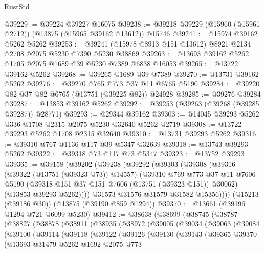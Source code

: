 \begin{lexlean}{RustStd}
\begin{coremodule}
@39229 := @39224 @39227 @16075
@39238 := @39218 @39229 (@15960 (@15961 @2712)) (@13875 (@15965 @39162 @13612)) @15746
@39241 := @15974 @39162 @5262 @5262
@39253 := @39241 (@15978 @8913 @151 @13612) @8921 @2134 @2708 @2075 @5230 @7390 @5230 @38869
@39263 := @13693 @39162 @5262 @1705 @2075 @1689 @39 @5230 @7389 @6838 @16053
@39265 := @13722 @39162 @5262
@39268 := @39265 @1689 @39 @7389
@39270 := @13731 @39162 @5262
@39276 := @39270 @765 @773 @37 @11 @6765 @5190
@39284 := @39220 @82 @37 @82 @6765 (@13751 (@39225 @82)) @24928
@39285 := @39276 @39284
@39287 := @13853 @39162 @5262
@39292 := @39253 (@39263 (@39268 (@39285 @39287)) @28771)
@39293 := @29344 @39162
@39303 := @14045 @39293 @5262 @336 @1708 @2315 @2075 @5230 @32640 @5262 @2719
@39308 := @13722 @39293 @5262 @1708 @2315 @32640
@39310 := @13731 @39293 @5262
@39316 := @39310 @767 @1136 @117 @39 @5347 @32639
@39318 := @13743 @39293 @5262
@39322 := @39318 @73 @117 @73 @5347
@39323 := @13752 @39293
@39365 := @39158
    (@39202
      (@39238
        (@39292
          (@39303
            (@39308
              (@39316
                (@39322 (@13751 (@39323 @73)) @14557)
                (@39310
                  @769
                  @773
                  @37
                  @11
                  @7606
                  @5190
                  (@39318 @151 @37 @151 @7606 (@13751 (@39323 @151)) @30062)
                  (@13853 @39293 @5262))))
            @31573
            @31576
            @31579
            @31582
            @15356))))
    (@15213 (@39186 @30))
    (@13875 (@39190 @859 @1294))
@39370 := @13661 (@39196 @1294 @721 @6099 @5230)
@39412 := @38638
    (@38699
      (@38745
        (@38787
          (@38827
            (@38878
              (@38911
                (@38935
                  (@38972
                    (@39005
                      (@39034
                        (@39063
                          (@39084
                            (@39100
                              (@39114
                                (@39118
                                  (@39122
                                    (@39126
                                      (@39130
                                        (@39143
                                          (@39365
                                            @39370
                                            (@13693
                                              @31479
                                              @5262
                                              @1692
                                              @2075
                                              @773

\end{coremodule}
\end{lexlean}
